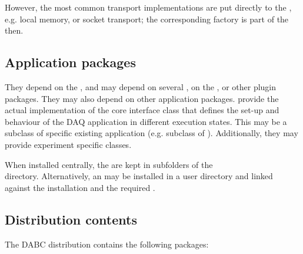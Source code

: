    However, the most common transport implementations are put 
   directly to the , e.g. local memory, or 
   socket transport; the corresponding factory is part of the  then. 
 
\subsection{Application packages}
They depend on the , and may depend 
on several , on the , or other plugin packages. 
They may also depend on other application packages. 
 provide the actual implementation of the core interface class
 that defines the set-up and behaviour of the DAQ application in 
different execution states. This may be a subclass of specific existing 
application (e.g. subclass of ). 
Additionally, they may provide experiment specific  classes.

When installed centrally, the  are kept in subfolders of the \\  
\small{} directory. Alternatively, an  may be installed in a user directory and linked against the  installation and the required .


     
\subsection{Distribution contents}
The DABC distribution contains the following packages:

